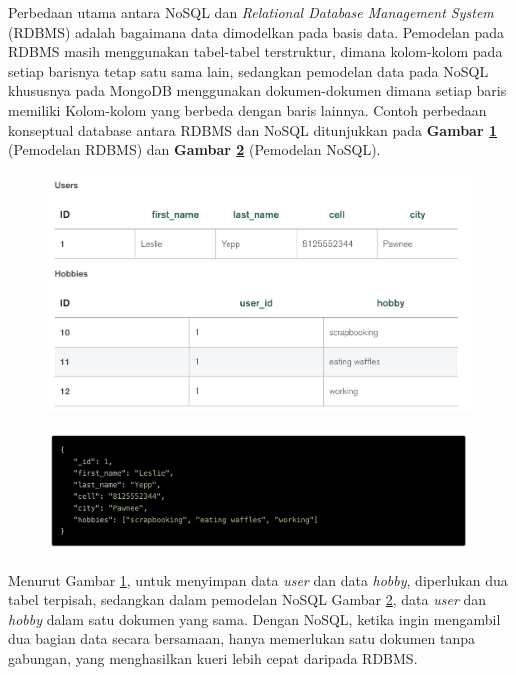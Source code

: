 	Perbedaan utama antara NoSQL dan \textit{Relational Database Management System} (RDBMS) adalah bagaimana data dimodelkan pada basis data. Pemodelan pada RDBMS masih menggunakan tabel-tabel terstruktur, dimana kolom-kolom pada setiap barisnya tetap satu sama lain, sedangkan pemodelan data pada NoSQL khususnya pada MongoDB menggunakan dokumen-dokumen dimana setiap baris memiliki Kolom-kolom yang berbeda dengan baris lainnya. Contoh perbedaan konseptual database antara RDBMS dan NoSQL ditunjukkan pada \textbf{Gambar \ref{fig:pemodelan_rdbms}} (Pemodelan RDBMS) dan \textbf{Gambar \ref{fig:pemodelan_nosql}} (Pemodelan NoSQL).
\begin{figure}[H]
	\centering
	\includegraphics[width=1\textwidth]{gambar/pemodelan_rdbms.png}
	\label{fig:pemodelan_rdbms}
\end{figure}
\begin{figure}[H]
	\centering
	\includegraphics[width=1\textwidth]{gambar/pemodelan_nosql.png}
	\label{fig:pemodelan_nosql}
\end{figure}
	
	Menurut Gambar \ref{fig:pemodelan_rdbms}, untuk menyimpan data \textit{user} dan data \textit{hobby}, diperlukan dua tabel terpisah, sedangkan dalam pemodelan NoSQL Gambar \ref{fig:pemodelan_nosql}, data \textit{user} dan \textit{hobby} dalam satu dokumen yang sama. Dengan NoSQL, ketika ingin mengambil dua bagian data secara bersamaan, hanya memerlukan satu dokumen tanpa gabungan, yang menghasilkan kueri lebih cepat daripada RDBMS.
	
